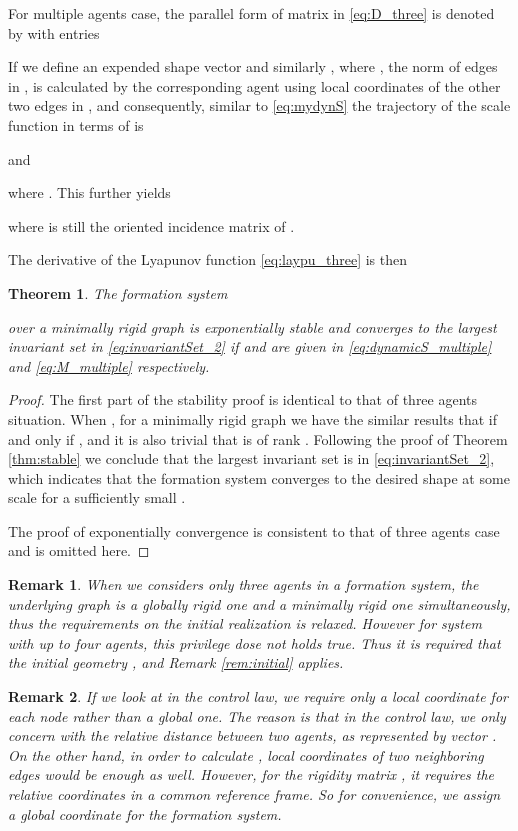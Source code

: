 \documentclass[times]{rncauth}
\newtheorem{thm}{Theorem}[section]
\newtheorem{rem}{Remark}[section]
\begin{document}
For multiple agents case, the parallel form of matrix  in
\eqref{eq:D_three} is denoted by   with entries

If we define an expended shape vector  and similarly
,
 where ,
the norm of edges in , is calculated by the corresponding agent
using local coordinates of the other two edges in , and
consequently, similar to \eqref{eq:mydynS} the trajectory of the
scale function in terms of  is

and


where .
This further yields

where  is still the oriented incidence matrix of .

The derivative of the Lyapunov function \eqref{eq:laypu_three} is
then


\begin{thm}\label{thm:stable_multi}
The formation system

over a minimally rigid graph is exponentially stable and converges
to the largest invariant set  in
\eqref{eq:invariantSet_2} if  and 
are given in \eqref{eq:dynamicS_multiple} and \eqref{eq:M_multiple}
respectively.
\end{thm}
\begin{proof}
The first part of the stability proof is identical to that of three
agents situation. When , for a minimally rigid graph we
have the similar results that 
if and only if , and it is also trivial that
 is of rank .
Following the proof of Theorem \ref{thm:stable} we conclude that the
largest invariant set is  in
\eqref{eq:invariantSet_2}, which indicates that the formation system
converges to the desired shape at some scale  for a
sufficiently small .

The proof of exponentially convergence is consistent to that of
three agents case and is omitted here.
\end{proof}
\begin{rem}
When we considers only three agents in a formation system, the
underlying graph is a globally rigid one and a minimally rigid one
simultaneously, thus the requirements on the initial realization is
relaxed. However for system with up to four agents, this privilege
dose not holds true. Thus it is required that the initial geometry
, and Remark \ref{rem:initial} applies.
\end{rem}
\begin{rem}
  If we look at  in the control law,
  we require only a local
  coordinate for each node rather than a global one.
  The reason is that in the control law, we only concern with the
  relative distance between two agents, as represented by vector
  . On the other hand, in order to calculate ,
  local coordinates of two neighboring edges would be enough as well.
  However, for the rigidity matrix ,
  it requires the relative coordinates in a common reference frame. So for convenience,
  we assign a global coordinate for the formation system.
\end{rem}
\end{document}
